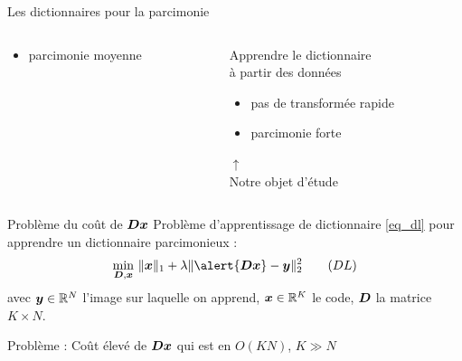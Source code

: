 \begin{frame}{Les dictionnaires pour la parcimonie}
\begin{columns}[t]
\begin{column}{0.49\textwidth}
\begin{block}{}
\begin{itemize}
	\item[\textcolor{red}{\xmark}] parcimonie moyenne
	\end{itemize}
	\end{block}
\end{column}
\begin{column}{0.49\textwidth}
	\begin{block}{}
	\alert{Apprendre} le dictionnaire\\
	à partir des données
	\begin{itemize}
	\item[\textcolor{red}{\xmark}] pas de transformée rapide
	\item[\textcolor{green2}{\cmark}] parcimonie forte
	\end{itemize}
	\end{block}
	\begin{tightcenter}
		$\uparrow$\\
		Notre objet d'étude
	\end{tightcenter}
\end{column}
\end{columns}


\end{frame}

\begin{frame}{Problème du coût de $\bm{D}\bm{x}$}
Problème d'apprentissage de dictionnaire \eqref{eq_dl} pour apprendre un dictionnaire parcimonieux :
\begin{align} 
\underset{\D,\x}{\min}~ & \| \x \|_1 + \lambda \| \alert{\D\x}-\y \|^2_2 \tag{$DL$}\label{eq_dl} \\
\end{align}
 avec $\bm{y} \in \mathbb{R}^N$ l'image sur laquelle on apprend, $\bm{x} \in \mathbb{R}^{K}$ le code, $\bm{D}$ la matrice $K \times N$.

\begin{alertblock}{}
Problème : Coût élevé de \alert{$\bm{D}\bm{x}$} qui est en \alert{$O(KN)$}, $K \gg N$
\end{alertblock}
\end{frame}


